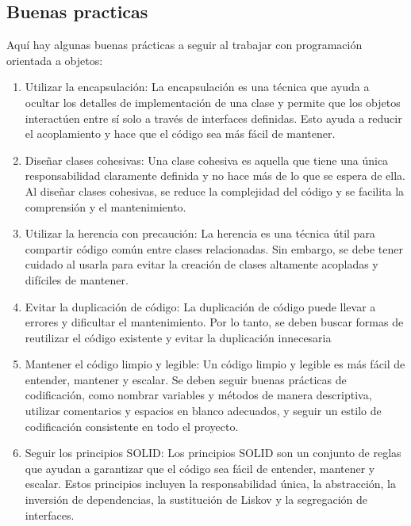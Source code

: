 \documentclass[executivepaper]{article}
\begin{document}
\subsection{Buenas practicas}
Aquí hay algunas buenas prácticas a seguir al trabajar con programación orientada a objetos:
\begin{enumerate}
    \item Utilizar la encapsulación: La encapsulación es una técnica que ayuda a ocultar los detalles de implementación de una clase y permite que los objetos interactúen entre sí solo a través de interfaces definidas. Esto ayuda a reducir el acoplamiento y hace que el código sea más fácil de mantener.
    \item Diseñar clases cohesivas: Una clase cohesiva es aquella que tiene una única responsabilidad claramente definida y no hace más de lo que se espera de ella. Al diseñar clases cohesivas, se reduce la complejidad del código y se facilita la comprensión y el mantenimiento.
    \item Utilizar la herencia con precaución: La herencia es una técnica útil para compartir código común entre clases relacionadas. Sin embargo, se debe tener cuidado al usarla para evitar la creación de clases altamente acopladas y difíciles de mantener.
    \item Evitar la duplicación de código: La duplicación de código puede llevar a errores y dificultar el mantenimiento. Por lo tanto, se deben buscar formas de reutilizar el código existente y evitar la duplicación innecesaria
    \item Mantener el código limpio y legible: Un código limpio y legible es más fácil de entender, mantener y escalar. Se deben seguir buenas prácticas de codificación, como nombrar variables y métodos de manera descriptiva, utilizar comentarios y espacios en blanco adecuados, y seguir un estilo de codificación consistente en todo el proyecto.
    \item Seguir los principios SOLID: Los principios SOLID son un conjunto de reglas que ayudan a garantizar que el código sea fácil de entender, mantener y escalar. Estos principios incluyen la responsabilidad única, la abstracción, la inversión de dependencias, la sustitución de Liskov y la segregación de interfaces.


\end{enumerate}
\end{document}
